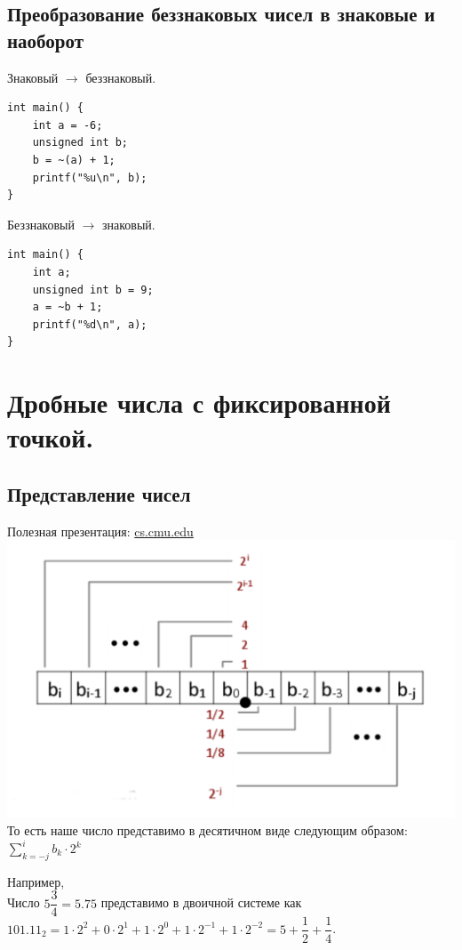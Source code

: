 \documentclass[12pt]{article}
\begin{document}
\subsection{Преобразование беззнаковых чисел в знаковые и наоборот}
Знаковый $\longrightarrow$ беззнаковый. 

\begin{verbatim}
int main() {
    int a = -6;
    unsigned int b;
    b = ~(a) + 1;
    printf("%u\n", b);
}
\end{verbatim}

Беззнаковый $\longrightarrow$ знаковый. 

\begin{verbatim}
int main() {
    int a;
    unsigned int b = 9;
    a = ~b + 1;
    printf("%d\n", a);
}
\end{verbatim}

\section{Дробные числа с фиксированной точкой.}
\subsection{Представление чисел}
Полезная презентация: 
\textcolor{blue}{\href{https://www.cs.cmu.edu/afs/cs/academic/class/15213-f15/www/lectures/04-float.pdf}{cs.cmu.edu}} \\
\includegraphics[scale=0.5]{./floating_point.png} \\

То есть наше число представимо в десятичном виде следующим образом: $\sum_{k = -j}^{i} b_{k} \cdot 2^{k}$

Например, \\
Число $5\dfrac{3}{4} = 5. 75$ представимо в двоичной системе как $101.11_{2} = 1 \cdot 2^{2} + 0 \cdot 2^{1} + 1 \cdot 2^{0} + 1 \cdot 2^{-1} + 1 \cdot 2^{-2} = 5 + \dfrac{1}{2} + \dfrac{1}{4}$.
\end{document}
